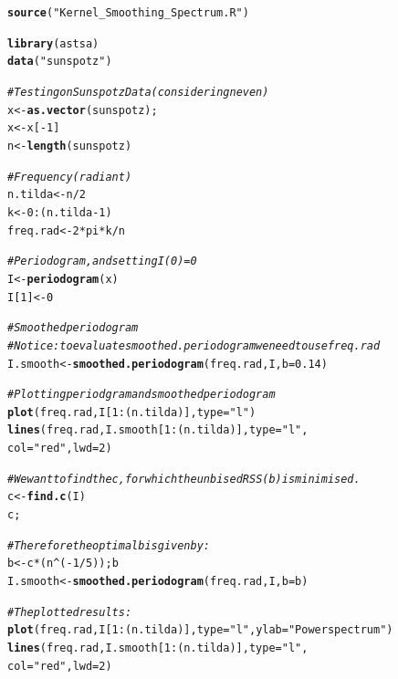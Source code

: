 \documentclass{article}\usepackage[]{graphicx}\usepackage[]{color}
\makeatletter
\newcommand{\hlnum}[1]{\textcolor[rgb]{0.686,0.059,0.569}{#1}}%
\newcommand{\hlstr}[1]{\textcolor[rgb]{0.192,0.494,0.8}{#1}}%
\newcommand{\hlcom}[1]{\textcolor[rgb]{0.678,0.584,0.686}{\textit{#1}}}%
\newcommand{\hlopt}[1]{\textcolor[rgb]{0,0,0}{#1}}%
\newcommand{\hlstd}[1]{\textcolor[rgb]{0.345,0.345,0.345}{#1}}%
\newcommand{\hlkwb}[1]{\textcolor[rgb]{0.69,0.353,0.396}{#1}}%
\newcommand{\hlkwc}[1]{\textcolor[rgb]{0.333,0.667,0.333}{#1}}%
\newcommand{\hlkwd}[1]{\textcolor[rgb]{0.737,0.353,0.396}{\textbf{#1}}}%
\newenvironment{kframe}{%
 \def\at@end@of@kframe{}%
 \ifinner\ifhmode%
  \def\at@end@of@kframe{\end{minipage}}%
  \begin{minipage}{\columnwidth}%
 \fi\fi%
 \def\FrameCommand##1{\hskip\@totalleftmargin \hskip-\fboxsep
 \colorbox{shadecolor}{##1}\hskip-\fboxsep
     \hskip-\linewidth \hskip-\@totalleftmargin \hskip\columnwidth}%
 \MakeFramed {\advance\hsize-\width
   \@totalleftmargin\z@ \linewidth\hsize
   \@setminipage}}%
 {\par\unskip\endMakeFramed%
 \at@end@of@kframe}
\newenvironment{knitrout}{}{} %
\makeatother
\begin{document}
\begin{knitrout}\footnotesize
{}\color{fgcolor}\begin{kframe}
\begin{alltt}
\hlkwd{source}\hlstd{(}\hlstr{"Kernel_Smoothing_Spectrum.R"}\hlstd{)}

\hlkwd{library}\hlstd{(astsa)}
\hlkwd{data}\hlstd{(}\hlstr{"sunspotz"}\hlstd{)}

\hlcom{# Testing on Sunspotz Data (considering n even)}
\hlstd{x} \hlkwb{<-} \hlkwd{as.vector}\hlstd{(sunspotz);}
\hlstd{x} \hlkwb{<-} \hlstd{x[}\hlopt{-}\hlnum{1}\hlstd{]}
\hlstd{n} \hlkwb{<-} \hlkwd{length}\hlstd{(sunspotz)}

\hlcom{# Frequency (radiant)}
\hlstd{n.tilda} \hlkwb{<-} \hlstd{n}\hlopt{/}\hlnum{2}
\hlstd{k} \hlkwb{<-} \hlnum{0}\hlopt{:}\hlstd{(n.tilda} \hlopt{-} \hlnum{1}\hlstd{)}
\hlstd{freq.rad} \hlkwb{<-} \hlnum{2}\hlopt{*}\hlstd{pi}\hlopt{*}\hlstd{k}\hlopt{/}\hlstd{n}

\hlcom{# Periodogram, and setting I(0) = 0}
\hlstd{I} \hlkwb{<-} \hlkwd{periodogram}\hlstd{(x)}
\hlstd{I[}\hlnum{1}\hlstd{]} \hlkwb{<-} \hlnum{0}

\hlcom{# Smoothed periodogram }
\hlcom{# Notice: to evaluate smoothed.periodogram we need to use freq.rad}
\hlstd{I.smooth} \hlkwb{<-} \hlkwd{smoothed.periodogram}\hlstd{(freq.rad, I,} \hlkwc{b} \hlstd{=} \hlnum{0.14}\hlstd{)}

\hlcom{# Plotting periodgram and smoothed periodogram}
\hlkwd{plot}\hlstd{(freq.rad, I[}\hlnum{1}\hlopt{:}\hlstd{(n.tilda)],} \hlkwc{type} \hlstd{=} \hlstr{"l"}\hlstd{)}
\hlkwd{lines}\hlstd{(freq.rad, I.smooth[}\hlnum{1}\hlopt{:}\hlstd{(n.tilda)],} \hlkwc{type} \hlstd{=} \hlstr{"l"}\hlstd{,}
      \hlkwc{col} \hlstd{=} \hlstr{"red"}\hlstd{,} \hlkwc{lwd} \hlstd{=} \hlnum{2}\hlstd{)}

\hlcom{# We want to find the c, for which the unbised RSS(b) is minimised.}
\hlstd{c} \hlkwb{<-} \hlkwd{find.c}\hlstd{(I)}
\hlstd{c;}

\hlcom{# Therefore the optimal b is given by:}
\hlstd{b} \hlkwb{<-} \hlstd{c} \hlopt{*} \hlstd{(n} \hlopt{^} \hlstd{(}\hlopt{-}\hlnum{1}\hlopt{/}\hlnum{5}\hlstd{)); b}
\hlstd{I.smooth} \hlkwb{<-} \hlkwd{smoothed.periodogram}\hlstd{(freq.rad, I,} \hlkwc{b} \hlstd{= b)}

\hlcom{# The plotted results:}
\hlkwd{plot}\hlstd{(freq.rad, I[}\hlnum{1}\hlopt{:}\hlstd{(n.tilda)],} \hlkwc{type} \hlstd{=} \hlstr{"l"}\hlstd{,} \hlkwc{ylab} \hlstd{=} \hlstr{"Power spectrum"}\hlstd{)}
\hlkwd{lines}\hlstd{(freq.rad, I.smooth[}\hlnum{1}\hlopt{:}\hlstd{(n.tilda)],} \hlkwc{type} \hlstd{=} \hlstr{"l"}\hlstd{,}
      \hlkwc{col} \hlstd{=} \hlstr{"red"}\hlstd{,} \hlkwc{lwd} \hlstd{=} \hlnum{2}\hlstd{)}
\end{alltt}
\end{kframe}
\end{knitrout}
\end{document}

